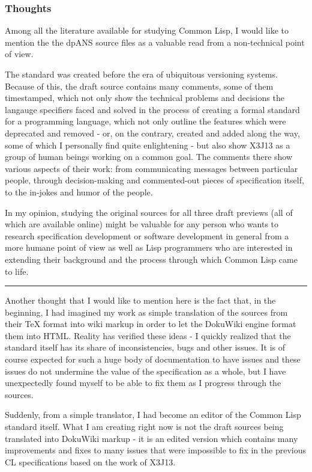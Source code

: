 \documentclass[11pt]{article}
\begin{document}
\subsubsection{Thoughts}
\label{sec:org7724673}
Among all the literature available for studying Common Lisp, I would like to mention the the dpANS source files as a valuable read from a non-technical point of view.

The standard was created before the era of ubiquitous versioning systems. Because of this, the draft source contains many comments, some of them timestamped, which not only show the technical problems and decisions the langauge specifiers faced and solved in the process of creating a formal standard for a programming language, which not only outline the features which were deprecated and removed - or, on the contrary, created and added along the way, some of which I personally find quite enlightening - but also show X3J13 as a group of human beings working on a common goal. The comments there show various aspects of their work: from communicating messages between particular people, through decision-making and commented-out pieces of specification itself, to the in-jokes and humor of the people.

In my opinion, studying the original sources for all three draft previews (all of which are available online) might be valuable for any person who wants to research specification development or software development in general from a more humane point of view as well as Lisp programmers who are interested in extending their background and the process through which Common Lisp came to life.

\rule{\linewidth}{0.5pt}

Another thought that I would like to mention here is the fact that, in the beginning, I had imagined my work as simple translation of the sources from their \TeX{} format into wiki markup in order to let the DokuWiki engine format them into HTML. Reality has verified these ideas - I quickly realized that the standard itself has its share of inconsistencies, bugs and other issues. It is of course expected for such a huge body of documentation to have issues and these issues do not undermine the value of the specification as a whole, but I have unexpectedly found myself to be able to fix them as I progress through the sources.

Suddenly, from a simple translator, I had become an editor of the Common Lisp standard itself. What I am creating right now is not the draft sources being translated into DokuWiki markup - it is an edited version which contains many improvements and fixes to many issues that were impossible to fix in the previous CL specifications based on the work of X3J13.
\end{document}
